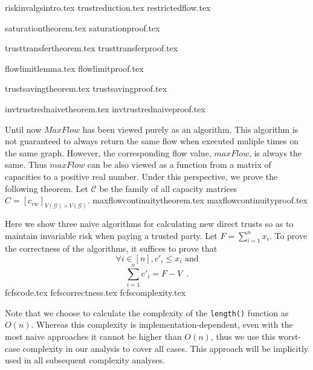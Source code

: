 \documentclass[11pt]{llncs}
\begin{document}
  {riskinvalgsintro.tex}
  {trustreduction.tex}
  {restrictedflow.tex}

  {saturationtheorem.tex}
  {saturationproof.tex}

  {trusttransfertheorem.tex}
  {trusttransferproof.tex}

  {flowlimitlemma.tex}
  {flowlimitproof.tex}

  {trustsavingtheorem.tex}
  {trustsavingproof.tex}

  {invtrustrednaivetheorem.tex}
  {invtrustrednaiveproof.tex}

  Until now $MaxFlow$ has been viewed purely as an algorithm. This algorithm is not guaranteed to always return the same
  flow when executed muliple times on the same graph. However, the corresponding flow value, $maxFlow$, is always the same.
  Thus $maxFlow$ can be also viewed as a function from a matrix of capacities to a positive real number. Under this
  perspective, we prove the following theorem. Let $\mathcal{C}$ be the family of all capacity matrices
  $C = [c_{vw}]_{V\left(\mathcal{G}\right) \times V\left(\mathcal{G}\right)}$.
  {maxflowcontinuitytheorem.tex}
  {maxflowcontinuityproof.tex}

  Here we show three naive algorithms for calculating new direct trusts so as to maintain invariable risk when paying
  a trusted party. Let $F = \sum\limits_{i=1}^{n}x_i$. To prove the correctness of the algorithms, it suffices to prove that
  \begin{equation}
  \label{naive:req1}
     \forall i \in [n], c'_i \leq x_i \mbox{ and}
  \end{equation}
  \begin{equation}
  \label{naive:req2}
     \sum\limits_{i=1}^{n}c'_i = F - V \enspace.
  \end{equation}
  {fcfscode.tex}
  {fcfscorrectness.tex}
  {fcfscomplexity.tex}

  Note that we choose to calculate the complexity of the \texttt{length()} function as $O\left(n\right)$. Whereas this
  complexity is implementation-dependent, even with the most naive approaches it cannot be higher than $O\left(n\right)$,
  thus we use this worst-case complexity in our analysis to cover all cases. This approach will be implicitly used in all
  subsequent complexity analyses.
\end{document}
